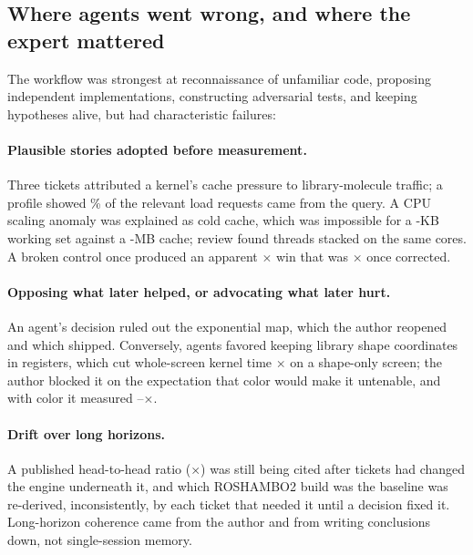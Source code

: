 \subsection{Where agents went wrong, and where the expert mattered}

The workflow was strongest at reconnaissance of unfamiliar code, proposing
independent implementations, constructing adversarial tests, and keeping
hypotheses alive, but had characteristic failures:

\paragraph{Plausible stories adopted before measurement.} Three tickets
attributed a kernel's cache pressure to library-molecule traffic; a profile
showed \QueryShareOfTexRequestsPercent\% of the relevant load requests came from
the query. A CPU scaling anomaly was explained as cold cache, which was
impossible for a \ImplausibleWorkingSetKB-KB working set against a
\ImplausibleCacheMB-MB cache; review found threads stacked on the same cores. A
broken control once produced an apparent \BrokenControlSpeedup$\times$ win that
was \CorrectedControlSpeedup$\times$ once corrected.

\paragraph{Opposing what later helped, or advocating what later hurt.} An
agent's decision ruled out the exponential map, which the author reopened and
which shipped. Conversely, agents favored keeping library shape coordinates in
registers, which cut whole-screen kernel time \RegisterShapeSpeedup$\times$ on a
shape-only screen; the author blocked it on the expectation that color would make it
untenable, and with color it measured \RegisterColorLow--\RegisterColorHigh$\times$.

\paragraph{Drift over long horizons.} A published head-to-head ratio
(\StaleHeadlineSpeedup$\times$) was still being cited after
\StaleHeadlineLandedTickets{} tickets had changed the engine underneath it, and
which ROSHAMBO2 build was the baseline was re-derived, inconsistently, by each
ticket that needed it until a decision fixed it. Long-horizon coherence came
from the author and from writing conclusions down, not single-session
memory.

